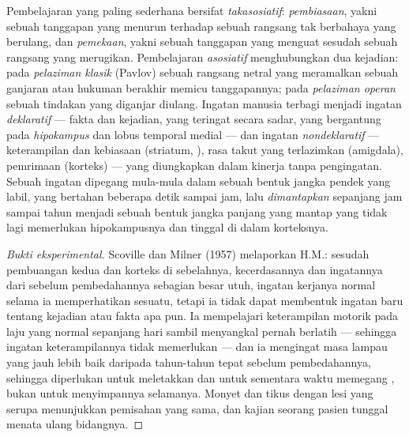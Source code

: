 \begin{definition}\label{def:b3:learning-memory:kinds}
%
Pembelajaran yang paling sederhana bersifat \emph{takasosiatif}: \emph{pembiasaan},
yakni sebuah tanggapan yang menurun terhadap sebuah rangsang tak berbahaya yang berulang, dan
\emph{pemekaan}, yakni sebuah tanggapan yang menguat sesudah sebuah rangsang yang merugikan.
Pembelajaran \emph{asosiatif} menghubungkan dua kejadian: pada \emph{pelaziman
klasik} (Pavlov) sebuah rangsang netral yang meramalkan sebuah ganjaran atau
hukuman berakhir memicu tanggapannya; pada \emph{pelaziman operan}
sebuah tindakan yang diganjar diulang. Ingatan manusia
terbagi menjadi ingatan \emph{deklaratif} --- fakta dan kejadian, yang teringat
secara sadar, yang bergantung pada \emph{hipokampus} dan lobus temporal
medial --- dan ingatan \emph{nondeklaratif} --- keterampilan dan kebiasaan
(striatum, ), rasa takut yang terlazimkan (amigdala), pemrimaan (korteks)
--- yang diungkapkan dalam kinerja tanpa pengingatan. Sebuah ingatan dipegang
mula-mula dalam sebuah bentuk jangka pendek yang labil, yang bertahan beberapa detik sampai jam, lalu
\emph{dimantapkan} sepanjang jam sampai tahun menjadi sebuah bentuk jangka panjang yang mantap
yang tidak lagi memerlukan hipokampusnya dan tinggal di dalam korteksnya.
\end{definition}

\begin{proof}[Bukti eksperimental]
Scoville dan Milner (1957) melaporkan H.M.: sesudah pembuangan kedua
 dan korteks di sebelahnya, kecerdasannya dan
ingatannya dari sebelum pembedahannya sebagian besar utuh, ingatan kerjanya
normal selama ia memperhatikan sesuatu, tetapi ia tidak dapat
membentuk ingatan baru tentang kejadian atau fakta apa pun. Ia mempelajari keterampilan motorik pada
laju yang normal sepanjang hari sambil menyangkal pernah berlatih --- sehingga
ingatan keterampilannya tidak memerlukan  --- dan ia mengingat masa
lampau yang jauh lebih baik daripada tahun-tahun tepat sebelum pembedahannya, sehingga 
diperlukan untuk meletakkan dan untuk sementara waktu memegang , bukan untuk
menyimpannya selamanya. Monyet dan tikus dengan lesi yang serupa menunjukkan
pemisahan yang sama, dan kajian seorang pasien tunggal menata ulang
bidangnya.
\end{proof}


